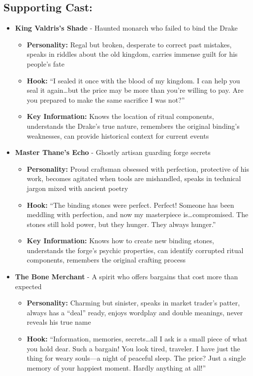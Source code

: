 \documentclass[11pt]{article}
\begin{document}
\subsection{Supporting Cast:}
\begin{itemize}
\item \textbf{King Valdris's Shade} - Haunted monarch who failed to bind the Drake
  \begin{itemize}
  \item \textbf{Personality:} Regal but broken, desperate to correct past mistakes, speaks in riddles about the old kingdom, carries immense guilt for his people's fate
  \item \textbf{Hook:} ``I sealed it once with the blood of my kingdom. I can help you seal it again\dots but the price may be more than you're willing to pay. Are you prepared to make the same sacrifice I was not?''
  \item \textbf{Key Information:} Knows the location of ritual components, understands the Drake's true nature, remembers the original binding's weaknesses, can provide historical context for current events
  \end{itemize}
\item \textbf{Master Thane's Echo} - Ghostly artisan guarding forge secrets
  \begin{itemize}
  \item \textbf{Personality:} Proud craftsman obsessed with perfection, protective of his work, becomes agitated when tools are mishandled, speaks in technical jargon mixed with ancient poetry
  \item \textbf{Hook:} ``The binding stones were perfect. Perfect! Someone has been meddling with perfection, and now my masterpiece is\dots compromised. The stones still hold power, but they hunger. They always hunger.''
  \item \textbf{Key Information:} Knows how to create new binding stones, understands the forge's psychic properties, can identify corrupted ritual components, remembers the original crafting process
  \end{itemize}
\item \textbf{The Bone Merchant} - A spirit who offers bargains that cost more than expected
  \begin{itemize}
  \item \textbf{Personality:} Charming but sinister, speaks in market trader's patter, always has a ``deal'' ready, enjoys wordplay and double meanings, never reveals his true name
  \item \textbf{Hook:} ``Information, memories, secrets\dots all I ask is a small piece of what you hold dear. Such a bargain! You look tired, traveler. I have just the thing for weary souls---a night of peaceful sleep. The price? Just a single memory of your happiest moment. Hardly anything at all!''

\end{itemize}
\end{itemize}
\end{document}
